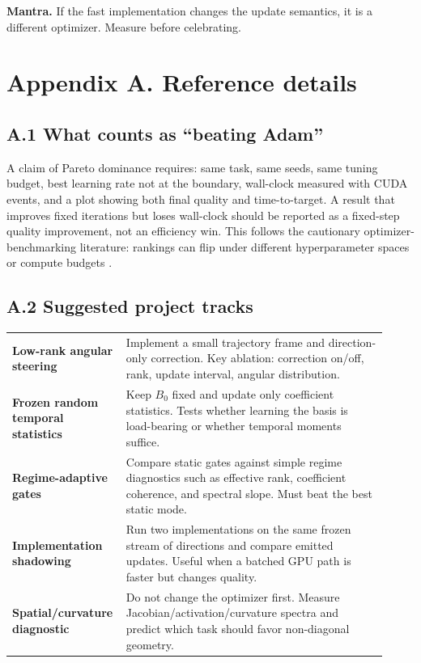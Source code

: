 \documentclass[10pt]{article}
\begin{document}
\vfill
\textbf{Mantra.} If the fast implementation changes the update semantics, it is a different optimizer. Measure before celebrating.

\clearpage

\appendix
\section*{Appendix A. Reference details}

\subsection*{A.1 What counts as ``beating Adam''}
A claim of Pareto dominance requires: same task, same seeds, same tuning budget, best learning rate not at the boundary, wall-clock measured with CUDA events, and a plot showing both final quality and time-to-target. A result that improves fixed iterations but loses wall-clock should be reported as a fixed-step quality improvement, not an efficiency win. This follows the cautionary optimizer-benchmarking literature: rankings can flip under different hyperparameter spaces or compute budgets \citep{choi2020empirical,teja2020hpo,kaddour2023notrain,algoperf2025}.

\subsection*{A.2 Suggested project tracks}
\begin{tabular}{@{}p{0.24\linewidth}p{0.68\linewidth}@{}}
\toprule
\textbf{Low-rank angular steering} & Implement a small trajectory frame and direction-only correction. Key ablation: correction on/off, rank, update interval, angular distribution. \\
\textbf{Frozen random temporal statistics} & Keep $B_0$ fixed and update only coefficient statistics. Tests whether learning the basis is load-bearing or whether temporal moments suffice. \\
\textbf{Regime-adaptive gates} & Compare static gates against simple regime diagnostics such as effective rank, coefficient coherence, and spectral slope. Must beat the best static mode. \\
\textbf{Implementation shadowing} & Run two implementations on the same frozen stream of directions and compare emitted updates. Useful when a batched GPU path is faster but changes quality. \\
\textbf{Spatial/curvature diagnostic} & Do not change the optimizer first. Measure Jacobian/activation/curvature spectra and predict which task should favor non-diagonal geometry. \\
\bottomrule
\end{tabular}
\end{document}

